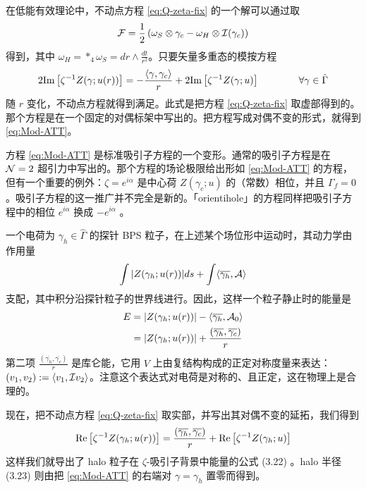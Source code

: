 在低能有效理论中，不动点方程 \eqref{eq:Q-zeta-fix} 的一个解可以通过取
%
\begin{equation}
\mathcal{F} =\frac{1}{2} \left( \omega_S \otimes \gamma_c - \omega_H \otimes
\mathcal{I}(\gamma_c) \right)
\end{equation}
%
得到，其中 $\omega_H = *_4 \omega_S = {dr \wedge \frac{dt}{r^2}}$。只要矢量多重态的模按方程
%
\begin{equation}\label{eq:Mod-ATT}
2 {\rm Im} \left[ \zeta^{-1} Z(\gamma; u(r))\right] = -
\frac{\langle \gamma, \gamma_c\rangle }{r} +2 {\rm Im} \left[
\zeta^{-1} Z(\gamma; u)\right] \qquad\qquad \forall \gamma \in \hat
\Gamma
\end{equation}
%
随 $r$ 变化，不动点方程就得到满足。此式是把方程 \eqref{eq:Q-zeta-fix} 取虚部得到的。那个方程是在一个固定的对偶标架中写出的。把方程写成对偶不变的形式，就得到 \eqref{eq:Mod-ATT}。

方程 \eqref{eq:Mod-ATT} 是标准吸引子方程的一个变形。通常的吸引子方程是在 $\mathcal{N}=2$ 超引力中写出的。那个方程的场论极限给出形如 \eqref{eq:Mod-ATT} 的方程，但有一个重要的例外：$\zeta = e^{i \alpha}$ 是中心荷 $Z(\gamma_c;u)$ 的（常数）相位，并且 $\Gamma_f=0$。吸引子方程的这一推广并不完全是新的。「orientihole」的方程同样把吸引子方程中的相位 $e^{i \alpha}$ 换成 $-e^{i \alpha}$ \cite{Denef:2009ja}。

一个电荷为 $\gamma_h\in \hat \Gamma $ 的探针 BPS 粒子，在上述某个场位形中运动时，其动力学由作用量
%
\begin{equation}
\int \vert Z(\gamma_h;u(r))\vert ds + \int \langle
\overline{\gamma_h}, \mathcal{A}\rangle
\end{equation}
%
支配，其中积分沿探针粒子的世界线进行。因此，这样一个粒子静止时的能量是
%
\begin{equation}
\begin{split}
E  & =  \vert Z(\gamma_h;u(r))\vert - \langle \overline{\gamma_h},
\mathcal{A}_0 \rangle\\
& =\vert Z(\gamma_h;u(r))\vert  + \frac{ (
\overline{\gamma_h},\overline{\gamma_c} )}{r}
 \\
\end{split}
\end{equation}
%
第二项 $\frac{ ( \overline{\gamma_h},\overline{\gamma_c}
)}{r}$ 是库仑能，它用 $V$ 上由复结构构成的正定对称度量来表达：$(v_1, v_2) := \langle v_1, \mathcal{I} v_2 \rangle$。注意这个表达式对电荷是对称的、且正定，这在物理上是合理的。

现在，把不动点方程 \eqref{eq:Q-zeta-fix} 取实部，并写出其对偶不变的延拓，我们得到
%
\begin{equation}
\operatorname{Re}\left[ \zeta^{-1} Z(\gamma_h;u(r))\right] =\frac{ (
\overline{\gamma_h},\overline{\gamma_c} )}{r} +\operatorname{Re} \left[
\zeta^{-1} Z(\gamma_h;u)\right]
\end{equation}
%
这样我们就导出了 halo 粒子在 $\zeta$-吸引子背景中能量的公式 (3.22)%
。halo 半径 (3.23)%
则由把 \eqref{eq:Mod-ATT} 的右端对 $\gamma=\gamma_h$ 置零而得到。

